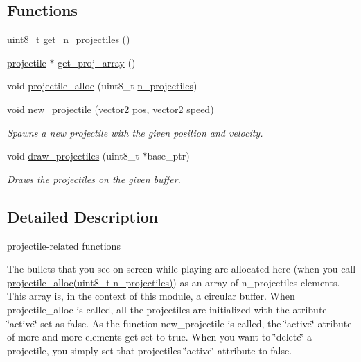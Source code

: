 \subsection*{Functions}
\begin{DoxyCompactItemize}
\item 
uint8\+\_\+t \hyperlink{group__projectiles_ga5694db4d07322ea0cb9792dd0409dcd6}{get\+\_\+n\+\_\+projectiles} ()
\item 
\hyperlink{structprojectile}{projectile} $\ast$ \hyperlink{group__projectiles_ga83c71feca8610bd78396e078b96c7607}{get\+\_\+proj\+\_\+array} ()
\item 
void \hyperlink{group__projectiles_ga1b3d00bd49fc0770838c70cb1d2d9e94}{projectile\+\_\+alloc} (uint8\+\_\+t \hyperlink{projectiles_8c_a72f6a4ef5d831709c1c10ff632d608ec}{n\+\_\+projectiles})
\item 
void \hyperlink{group__projectiles_ga1dcccbbcaf5fbc336ec52666ff0960ac}{new\+\_\+projectile} (\hyperlink{structvector2}{vector2} pos, \hyperlink{structvector2}{vector2} speed)
\begin{DoxyCompactList}\small\item\em Spawns a new projectile with the given position and velocity. \end{DoxyCompactList}\item 
void \hyperlink{group__projectiles_gae77390eb18c5b9c31165e891a1ab4b19}{draw\+\_\+projectiles} (uint8\+\_\+t $\ast$base\+\_\+ptr)
\begin{DoxyCompactList}\small\item\em Draws the projectiles on the given buffer. \end{DoxyCompactList}\end{DoxyCompactItemize}


\subsection{Detailed Description}
projectile-\/related functions 

The bullets that you see on screen while playing are allocated here (when you call \hyperlink{group__projectiles_ga1b3d00bd49fc0770838c70cb1d2d9e94}{projectile\+\_\+alloc(uint8\+\_\+t n\+\_\+projectiles)}) as an array of n\+\_\+projectiles elements. This array is, in the context of this module, a circular buffer. When projectile\+\_\+alloc is called, all the projectiles are initialized with the atribute \char`\"{}active\char`\"{} set as false. As the function new\+\_\+projectile is called, the \char`\"{}active\char`\"{} atribute of more and more elements get set to true. When you want to \char`\"{}delete\char`\"{} a projectile, you simply set that projectile\textquotesingle{}s \char`\"{}active\char`\"{} attribute to false. 

